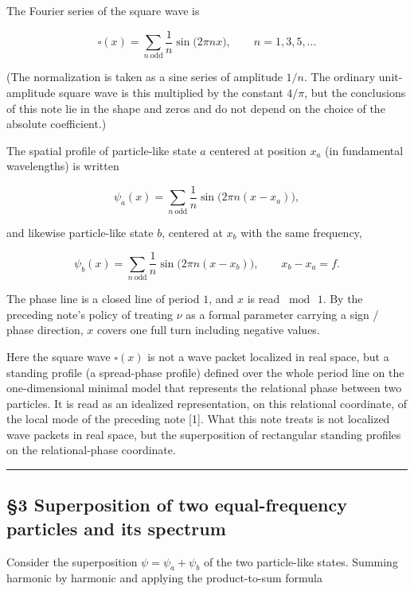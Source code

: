 \documentclass[
]{article}
\begin{document}
The Fourier series of the square wave is

\[\square(x)=\sum_{n\ \mathrm{odd}}\frac{1}{n}\sin\!\big(2\pi n x\big),\qquad n=1,3,5,\dots\]

(The normalization is taken as a sine series of amplitude \(1/n\). The
ordinary unit-amplitude square wave is this multiplied by the constant
\(4/\pi\), but the conclusions of this note lie in the shape and zeros
and do not depend on the choice of the absolute coefficient.)

The spatial profile of particle-like state \(a\) centered at position
\(x_a\) (in fundamental wavelengths) is written

\[\psi_a(x)=\sum_{n\ \mathrm{odd}}\frac{1}{n}\sin\!\big(2\pi n (x-x_a)\big),\]

and likewise particle-like state \(b\), centered at \(x_b\) with the
same frequency,

\[\psi_b(x)=\sum_{n\ \mathrm{odd}}\frac{1}{n}\sin\!\big(2\pi n (x-x_b)\big),\qquad x_b-x_a=f.\]

The phase line is a closed line of period \(1\), and \(x\) is read
\(\bmod\,1\). By the preceding note's policy of treating \(\nu\) as a
formal parameter carrying a sign / phase direction, \(x\) covers one
full turn including negative values.

Here the square wave \(\square(x)\) is not a wave packet localized in
real space, but a standing profile (a spread-phase profile) defined over
the whole period line on the one-dimensional minimal model that
represents the relational phase between two particles. It is read as an
idealized representation, on this relational coordinate, of the local
mode of the preceding note {[}1{]}. What this note treats is not
localized wave packets in real space, but the superposition of
rectangular standing profiles on the relational-phase coordinate.

\begin{center}\rule{0.5\linewidth}{0.5pt}\end{center}

\subsection{§3 Superposition of two equal-frequency particles and its
spectrum}\label{superposition-of-two-equal-frequency-particles-and-its-spectrum}

Consider the superposition \(\psi=\psi_a+\psi_b\) of the two
particle-like states. Summing harmonic by harmonic and applying the
product-to-sum formula
\end{document}
